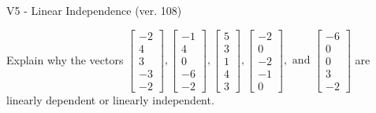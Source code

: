 \begin{exercise}
  \begin{exerciseTitle}V5 - Linear Independence (ver. 108)\end{exerciseTitle}
  \begin{exerciseStatement}
    Explain why the vectors \(\left[\begin{array}{r}
-2 \\
4 \\
3 \\
-3 \\
-2
\end{array}\right] , \left[\begin{array}{r}
-1 \\
4 \\
0 \\
-6 \\
-2
\end{array}\right] , \left[\begin{array}{r}
5 \\
3 \\
1 \\
4 \\
3
\end{array}\right] , \left[\begin{array}{r}
-2 \\
0 \\
-2 \\
-1 \\
0
\end{array}\right] , \text{ and } \left[\begin{array}{r}
-6 \\
0 \\
0 \\
3 \\
-2
\end{array}\right]\) are linearly dependent or linearly independent.	



\end{exerciseStatement}
\end{exercise}
